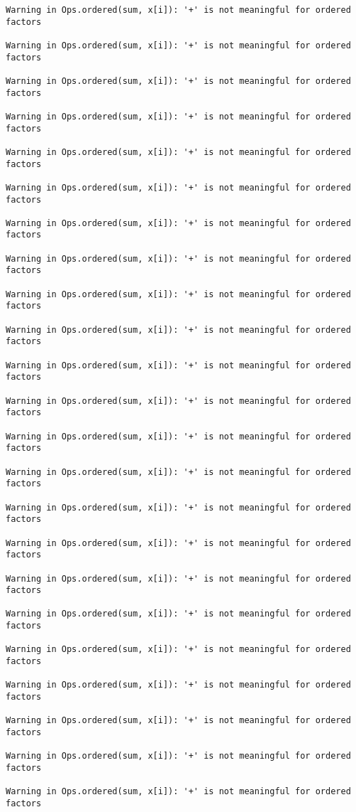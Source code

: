 \documentclass[]{article}
\begin{document}
\begin{verbatim}
Warning in Ops.ordered(sum, x[i]): '+' is not meaningful for ordered
factors

Warning in Ops.ordered(sum, x[i]): '+' is not meaningful for ordered
factors

Warning in Ops.ordered(sum, x[i]): '+' is not meaningful for ordered
factors

Warning in Ops.ordered(sum, x[i]): '+' is not meaningful for ordered
factors

Warning in Ops.ordered(sum, x[i]): '+' is not meaningful for ordered
factors

Warning in Ops.ordered(sum, x[i]): '+' is not meaningful for ordered
factors

Warning in Ops.ordered(sum, x[i]): '+' is not meaningful for ordered
factors

Warning in Ops.ordered(sum, x[i]): '+' is not meaningful for ordered
factors

Warning in Ops.ordered(sum, x[i]): '+' is not meaningful for ordered
factors

Warning in Ops.ordered(sum, x[i]): '+' is not meaningful for ordered
factors

Warning in Ops.ordered(sum, x[i]): '+' is not meaningful for ordered
factors

Warning in Ops.ordered(sum, x[i]): '+' is not meaningful for ordered
factors

Warning in Ops.ordered(sum, x[i]): '+' is not meaningful for ordered
factors

Warning in Ops.ordered(sum, x[i]): '+' is not meaningful for ordered
factors

Warning in Ops.ordered(sum, x[i]): '+' is not meaningful for ordered
factors

Warning in Ops.ordered(sum, x[i]): '+' is not meaningful for ordered
factors

Warning in Ops.ordered(sum, x[i]): '+' is not meaningful for ordered
factors

Warning in Ops.ordered(sum, x[i]): '+' is not meaningful for ordered
factors

Warning in Ops.ordered(sum, x[i]): '+' is not meaningful for ordered
factors

Warning in Ops.ordered(sum, x[i]): '+' is not meaningful for ordered
factors

Warning in Ops.ordered(sum, x[i]): '+' is not meaningful for ordered
factors

Warning in Ops.ordered(sum, x[i]): '+' is not meaningful for ordered
factors

Warning in Ops.ordered(sum, x[i]): '+' is not meaningful for ordered
factors


\end{verbatim}
\end{document}
